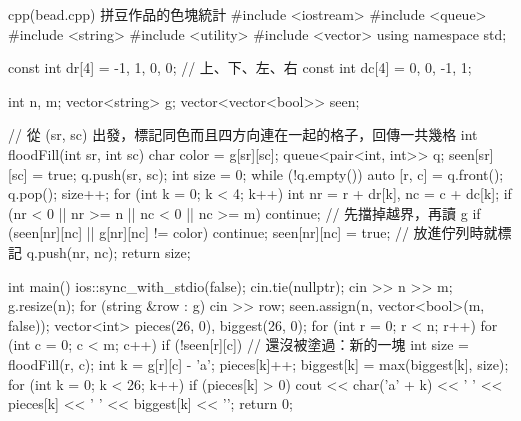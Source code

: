 \begin{example}[label=ex:beads]{cpp}{(bead.cpp) 拼豆作品的色塊統計}
#include <iostream>
#include <queue>
#include <string>
#include <utility>
#include <vector>
using namespace std;

const int dr[4] = {-1, 1, 0, 0};          // 上、下、左、右
const int dc[4] = {0, 0, -1, 1};

int n, m;
vector<string> g;
vector<vector<bool>> seen;

// 從 (sr, sc) 出發，標記同色而且四方向連在一起的格子，回傳一共幾格
int floodFill(int sr, int sc) {
    char color = g[sr][sc];
    queue<pair<int, int>> q;
    seen[sr][sc] = true;
    q.push({sr, sc});
    int size = 0;
    while (!q.empty()) {
        auto [r, c] = q.front();
        q.pop();
        size++;
        for (int k = 0; k < 4; k++) {
            int nr = r + dr[k], nc = c + dc[k];
            if (nr < 0 || nr >= n || nc < 0 || nc >= m) {
                continue;                     // 先擋掉越界，再讀 g
            }
            if (seen[nr][nc] || g[nr][nc] != color) {
                continue;
            }
            seen[nr][nc] = true;              // 放進佇列時就標記
            q.push({nr, nc});
        }
    }
    return size;
}

int main() {
    ios::sync_with_stdio(false);
    cin.tie(nullptr);
    cin >> n >> m;
    g.resize(n);
    for (string &row : g) {
        cin >> row;
    }
    seen.assign(n, vector<bool>(m, false));
    vector<int> pieces(26, 0), biggest(26, 0);
    for (int r = 0; r < n; r++) {
        for (int c = 0; c < m; c++) {
            if (!seen[r][c]) {                // 還沒被塗過：新的一塊
                int size = floodFill(r, c);
                int k = g[r][c] - 'a';
                pieces[k]++;
                biggest[k] = max(biggest[k], size);
            }
        }
    }
    for (int k = 0; k < 26; k++) {
        if (pieces[k] > 0) {
            cout << char('a' + k) << ' ' << pieces[k] << ' '
                 << biggest[k] << '\n';
        }
    }
    return 0;
}
\end{example}


